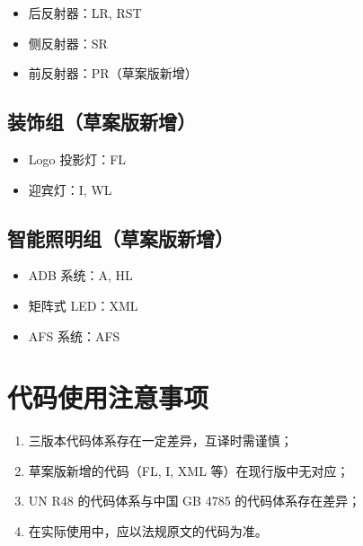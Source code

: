 \begin{itemize}[leftmargin=2em]
    \item 后反射器：LR, RST
    \item 侧反射器：SR
    \item 前反射器：PR（草案版新增）
\end{itemize}

\subsection{装饰组（草案版新增）}

\begin{itemize}[leftmargin=2em]
    \item Logo 投影灯：FL
    \item 迎宾灯：I, WL
\end{itemize}

\subsection{智能照明组（草案版新增）}

\begin{itemize}[leftmargin=2em]
    \item ADB 系统：A, HL
    \item 矩阵式 LED：XML
    \item AFS 系统：AFS
\end{itemize}

\section{代码使用注意事项}

\begin{enumerate}[leftmargin=2em]
    \item 三版本代码体系存在一定差异，互译时需谨慎；
    \item 草案版新增的代码（FL, I, XML 等）在现行版中无对应；
    \item UN R48 的代码体系与中国 GB 4785 的代码体系存在差异；
    \item 在实际使用中，应以法规原文的代码为准。
\end{enumerate}